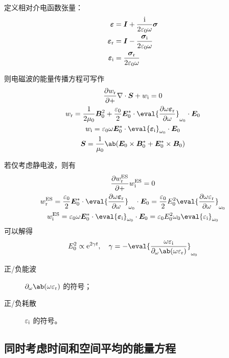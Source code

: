 定义相对介电函数张量：
\begin{subequations}\begin{align}
\bm{\varepsilon} &= \bm{I} + \frac{\mathrm{i}}{2\varepsilon_0 \omega} \bm{\sigma} \\
\bm{\varepsilon}_{\mathrm{r}} &= \bm{I} - \frac{\bm{\sigma}_{\mathrm{i}}}{2\varepsilon_0 \omega} \\
\bm{\varepsilon}_{\mathrm{i}} &= \frac{\bm{\sigma}_{\mathrm{r}}}{2\varepsilon_0 \omega} \\
\end{align}\end{subequations}

则电磁波的能量传播方程可写作
\begin{subequations}\begin{gather}
\pdv{w_\re} + \dive{\vector{S}} + w_\im = 0 \\
w_\re = \frac{1}{2\mu_0} \vector{B}_0^2
    + \frac{\varepsilon_0}{2} \vector{E}_0^*
        \cdot \eval{\pdv{\omega \vector{\varepsilon}_\re}{\omega}}_{\omega_0}
        \cdot \vector{E}_0 \\
w_\im = \varepsilon_0 \omega \vector{E}_0^*
        \cdot \eval{\vector{\varepsilon}_\im}_{\omega_0}
        \cdot \vector{E}_0 \\
\vector{S} = \frac{1}{\mu_0} \ab(
    \vector{E}_0 \times \vector{B}_0^*
    + \vector{E}_0^* \times \vector{B}_0
)
\end{gather}\end{subequations}

若仅考虑静电波，则有
\begin{subequations}\begin{gather}
\pdv{w^\text{ES}_\re} + w^\text{ES}_\im = 0 \\
w^\text{ES}_\re = \frac{\varepsilon_0}{2} \vector{E}_0^*
        \cdot \eval{\pdv{\omega \vector{\varepsilon}_\re}{\omega}}_{\omega_0}
        \cdot \vector{E}_0
= \frac{\varepsilon_0}{2} E_0^2 \eval{\pdv{\omega \varepsilon_\re}{\omega}}_{\omega_0 }\\
w^\text{ES}_\im = \varepsilon_0 \omega \vector{E}_0^*
        \cdot \eval{\vector{\varepsilon}_\im}_{\omega_0}
        \cdot \vector{E}_0
= \varepsilon_0 E_0^2 \omega_0 \eval{\varepsilon_\im}_{\omega_0}
\end{gather}\end{subequations}
可以解得
\begin{equation}
E_0^2 \propto \eu^{2 \gamma t}, \quad
\gamma = - \eval{\frac{\omega \varepsilon_\im}{
    \pdv{\ab(\omega \varepsilon_\re)}!{\omega}
}}_{\omega_0}
\end{equation}

\begin{description}
    \item[正/负能波] $\pdv{\ab(\omega \varepsilon_\re)}!{\omega}$ 的符号；
    \item[正/负耗散] $\varepsilon_{\mathrm{i}}$ 的符号。
\end{description}

\subsection{同时考虑时间和空间平均的能量方程}
